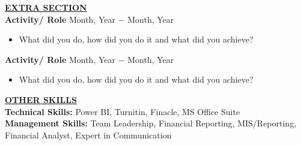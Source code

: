 \documentclass{article}
\begin{document}
\noindent \textbf{\underline{EXTRA SECTION}} \\
\noindent \textbf{Activity/ Role} \hfill Month, Year $-$ Month, Year
\begin{itemize}[noitemsep,nolistsep,leftmargin=*]
\item What did you do, how did you do it and what did you achieve? \\
\end{itemize}

\noindent \textbf{Activity/ Role} \hfill Month, Year $-$ Month, Year
\begin{itemize}[noitemsep,nolistsep,leftmargin=*]
\item What did you do, how did you do it and what did you achieve? \\
\end{itemize}

\noindent \textbf{\underline{OTHER SKILLS}} \\
\noindent \textbf{Technical Skills:} Power BI, Turnitin, Finacle, MS Office Suite \\
\noindent \textbf{Management Skills:} Team Leadership, Financial Reporting, MIS/Reporting, Financial Analyst, Expert in Communication \\
\end{document}
